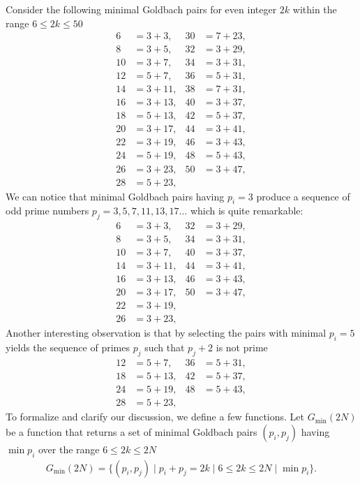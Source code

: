 Consider the following minimal Goldbach pairs for even integer $2k$ within the range $6 \leq 2k \leq 50$
\begin{align*}
    6  &= 3 + 3,   & 30 &= 7 + 23, \\
    8  &= 3 + 5,   & 32 &= 3 + 29, \\
    10 &= 3 + 7,   & 34 &= 3 + 31, \\
    12 &= 5 + 7,   & 36 &= 5 + 31, \\
    14 &= 3 + 11,  & 38 &= 7 + 31, \\
    16 &= 3 + 13,  & 40 &= 3 + 37, \\
    18 &= 5 + 13,  & 42 &= 5 + 37, \\
    20 &= 3 + 17,  & 44 &= 3 + 41, \\
    22 &= 3 + 19,  & 46 &= 3 + 43, \\
    24 &= 5 + 19,  & 48 &= 5 + 43, \\
    26 &= 3 + 23,  & 50 &= 3 + 47, \\
    28 &= 5 + 23,  &
\end{align*}
We can notice that minimal Goldbach pairs having $p_i=3$ produce a sequence of odd prime numbers
$p_j = 3, 5, 7, 11, 13, 17 \dots$ which is quite remarkable:
\begin{align*}
    6  &= 3 + 3,   & 32 &= 3 + 29, \\
    8  &= 3 + 5,   & 34 &= 3 + 31, \\
    10 &= 3 + 7,   & 40 &= 3 + 37, \\
    14 &= 3 + 11,  & 44 &= 3 + 41, \\
    16 &= 3 + 13,  & 46 &= 3 + 43, \\
    20 &= 3 + 17,  & 50 &= 3 + 47, \\
    22 &= 3 + 19,  &              \\
    26 &= 3 + 23,  &
\end{align*}
Another interesting observation is that by selecting the pairs with minimal $p_i=5$ yields
the sequence of primes $p_j$ such that $p_j+2$ is not prime
\begin{align*}
    12 &= 5 + 7,   & 36 &= 5 + 31, \\
    18 &= 5 + 13,  & 42 &= 5 + 37, \\
    24 &= 5 + 19,  & 48 &= 5 + 43, \\
    28 &= 5 + 23,  &
\end{align*}
To formalize and clarify our discussion, we define a few functions.
Let $G_{\min} (2N)$ be a function that returns a set of minimal Goldbach pairs $(p_i, p_j)$ having $\min p_i$
over the range $6 \leq 2k \leq 2N$
\begin{align*}
    G_{\min} (2N) = \{(p_i, p_j) \mid p_i + p_j = 2k \mid 6 \leq 2k \leq 2N \mid \min p_i \}.
\end{align*}


